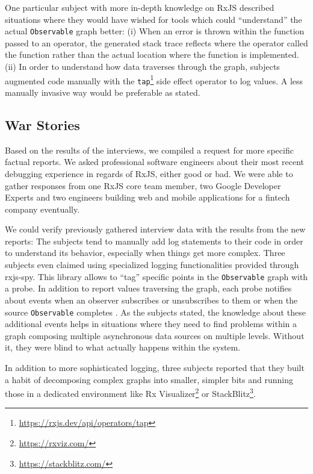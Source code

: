 \documentclass[12pt,a4paper]{article}
\begin{document}
One particular subject with more in-depth knowledge on RxJS described situations where they would have wished for tools which could ``understand'' the actual \texttt{Observable} graph better: (i) When an error is thrown within the function passed to an operator, the generated stack trace reflects where the operator called the function rather than the actual location where the function is implemented. (ii) In order to understand how data traverses through the graph, subjects augmented code manually with the \texttt{tap}\footnote{\url{https://rxjs.dev/api/operators/tap}} side effect operator to log values. A less manually invasive way would be preferable as stated.

\subsection{War Stories}

Based on the results of the interviews, we compiled a request for more specific factual reports. We asked professional software engineers about their most recent debugging experience in regards of RxJS, either good or bad. We were able to gather responses from one RxJS core team member, two Google Developer Experts and two engineers building web and mobile applications for a fintech company eventually.

We could verify previously gathered interview data with the results from the new reports: The subjects tend to manually add log statements to their code in order to understand its behavior, especially when things get more complex. Three subjects even claimed using specialized logging functionalities provided through rxjs-spy. This library allows to ``tag'' specific points in the \texttt{Observable} graph with a probe. In addition to report values traversing the graph, each probe notifies about events when an observer subscribes or unsubscribes to them or when the source \texttt{Observable} completes \cite{rxjslifecycle}. As the subjects stated, the knowledge about these additional events helps in situations where they need to find problems within a graph composing multiple asynchronous data sources on multiple levels. Without it, they were blind to what actually happens within the system.

In addition to more sophisticated logging, three subjects reported that they built a habit of decomposing complex graphs into smaller, simpler bits and running those in a dedicated environment like Rx Visualizer\footnote{\url{https://rxviz.com/}} or StackBlitz\footnote{\url{https://stackblitz.com/}}.
\end{document}
